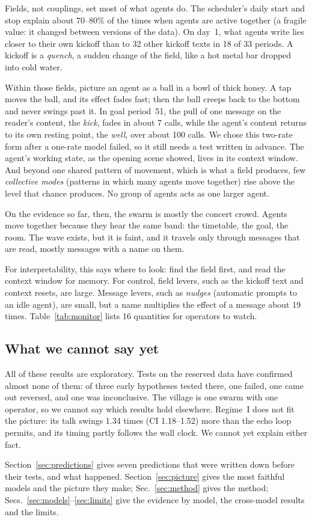 Fields, not couplings, set most of what agents do. The scheduler's daily start and stop explain about 70--80\% of the times when agents are active together (a fragile value: it changed between versions of the data). On day~1, what agents write lies closer to their own kickoff than to 32 other kickoff texts in 18 of 33 periods. A kickoff is a \emph{quench}, a sudden change of the field, like a hot metal bar dropped into cold water.

Within those fields, picture an agent as a ball in a bowl of thick honey. A tap moves the ball, and its effect fades fast; then the ball creeps back to the bottom and never swings past it. In goal period~51, the pull of one message on the reader's content, the \emph{kick}, fades in about 7 calls, while the agent's content returns to its own resting point, the \emph{well}, over about 100 calls. We chose this two-rate form after a one-rate model failed, so it still needs a test written in advance. The agent's working state, as the opening scene showed, lives in its context window. And beyond one shared pattern of movement, which is what a field produces, few \emph{collective modes} (patterns in which many agents move together) rise above the level that chance produces. No group of agents acts as one larger agent.

On the evidence so far, then, the swarm is mostly the concert crowd. Agents move together because they hear the same band: the timetable, the goal, the room. The wave exists, but it is faint, and it travels only through messages that are read, mostly messages with a name on them.

For interpretability, this says where to look: find the field first, and read the context window for memory. For control, field levers, such as the kickoff text and context resets, are large. Message levers, such as \emph{nudges} (automatic prompts to an idle agent), are small, but a name multiplies the effect of a message about 19 times. Table~\ref{tab:monitor} lists 16 quantities for operators to watch.

\subsection*{What we cannot say yet}

All of these results are exploratory. Tests on the reserved data have confirmed almost none of them: of three early hypotheses tested there, one failed, one came out reversed, and one was inconclusive. The village is one swarm with one operator, so we cannot say which results hold elsewhere. Regime~I does not fit the picture: its talk swings 1.34 times (CI 1.18--1.52) more than the echo loop permits, and its timing partly follows the wall clock. We cannot yet explain either fact.


Section~\ref{sec:predictions} gives seven predictions that were written down before their tests, and what happened. Section~\ref{sec:picture} gives the most faithful models and the picture they make; Sec.~\ref{sec:method} gives the method; Secs.~\ref{sec:models}--\ref{sec:limits} give the evidence by model, the cross-model results and the limits.

